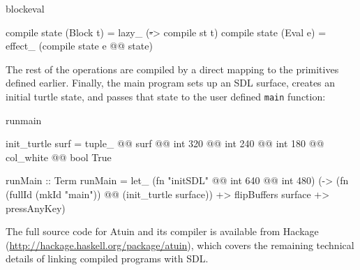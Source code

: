 \begin{SaveVerbatim}{blockeval}

compile state (Block t) = lazy_ (\st -> compile st t)
compile state (Eval e)  = effect_ (compile state e @@ state)

\end{SaveVerbatim}

\noindent
The rest of the operations are compiled by a direct mapping to the
primitives defined earlier. Finally, the main program sets up an SDL
surface, creates an initial turtle state, and passes that state to the
user defined \texttt{main} function:

\begin{SaveVerbatim}{runmain}

init_turtle surf = tuple_ @@ surf @@ 
                             int 320 @@ int 240 @@ int 180 @@ 
                             col_white @@ bool True

runMain :: Term
runMain = let_ (fn "initSDL" @@ int 640 @@ int 480)
          (\surface -> 
            (fn (fullId (mkId "main")) @@ (init_turtle surface)) +>
             flipBuffers surface +> pressAnyKey)

\end{SaveVerbatim}

The full source code for Atuin and its compiler is available from
Hackage (\url{http://hackage.haskell.org/package/atuin}), which
covers the remaining technical details of linking compiled programs
with SDL.
